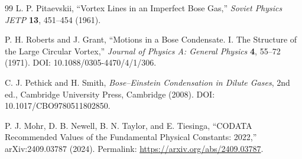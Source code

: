 \documentclass[11pt]{article}
\begin{document}
\begin{thebibliography}{99}
L. P. Pitaevskii,
``Vortex Lines in an Imperfect Bose Gas,''
\emph{Soviet Physics JETP} \textbf{13}, 451--454 (1961).

P. H. Roberts and J. Grant,
``Motions in a Bose Condensate. I. The Structure of the Large Circular Vortex,''
\emph{Journal of Physics A: General Physics} \textbf{4}, 55--72 (1971).
DOI: 10.1088/0305-4470/4/1/306.

C. J. Pethick and H. Smith,
\emph{Bose--Einstein Condensation in Dilute Gases}, 2nd ed.,
Cambridge University Press, Cambridge (2008).
DOI: 10.1017/CBO9780511802850.

P. J. Mohr, D. B. Newell, B. N. Taylor, and E. Tiesinga,
``CODATA Recommended Values of the Fundamental Physical Constants: 2022,''
arXiv:2409.03787 (2024).
Permalink: \url{https://arxiv.org/abs/2409.03787}.

\end{thebibliography}
\end{document}
